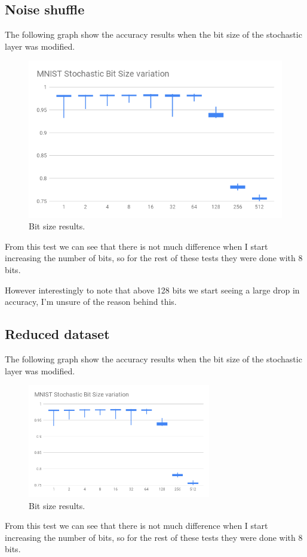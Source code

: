 \documentclass[a4paper,twoside,phd]{BYUPhys}
\begin{document}
\subsection{Noise shuffle}
The following graph show the accuracy results when the bit size of the stochastic layer was modified.
\begin{figure}[H]
\centering
\includegraphics[width=12cm]{results/bitsize.png}
\caption{Bit size results.}
\label{fig:bitsize}
\end{figure}
From this test we can see that there is not much difference when I start increasing the number of bits, so for the rest of these tests they were done with 8 bits.

However interestingly to note that above 128 bits we start seeing a large drop in accuracy, I'm unsure of the reason behind this.

\subsection{Reduced dataset}
The following graph show the accuracy results when the bit size of the stochastic layer was modified.
\begin{figure}[H]
\centering
\includegraphics[width=8cm]{results/bitsize.png}
\caption{Bit size results.}
\label{fig:bitsize}
\end{figure}
From this test we can see that there is not much difference when I start increasing the number of bits, so for the rest of these tests they were done with 8 bits.
\end{document}
